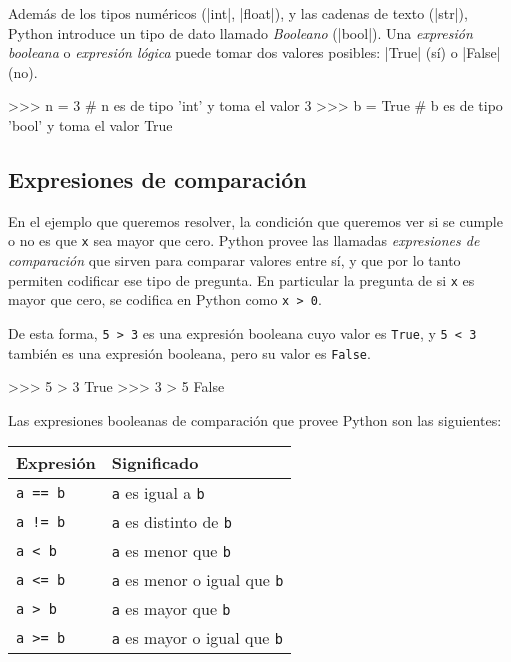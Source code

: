 Además de los tipos numéricos (|int|, |float|), y las cadenas de texto (|str|),
Python introduce un tipo de dato llamado {\it Booleano} (|bool|). Una {\it
expresión booleana} o {\it expresión lógica} puede tomar dos valores posibles:
|True| (sí) o |False| (no).

\begin{codigo-python-sn}
>>> n = 3    # n es de tipo 'int' y toma el valor 3
>>> b = True # b es de tipo 'bool' y toma el valor True
\end{codigo-python-sn}

\subsection{Expresiones de comparación}

En el ejemplo que queremos resolver, la condición que queremos ver si se
cumple o no es que \lstinline!x! sea mayor que cero. Python provee las
llamadas {\it expresiones de comparación} que sirven para comparar valores
entre sí, y que por lo tanto permiten codificar ese tipo de pregunta.  En
particular la pregunta de si \lstinline!x! es mayor que cero, se codifica
en Python como \lstinline!x > 0!.

De esta forma, \lstinline+5 > 3+ es una expresión booleana cuyo valor es
\lstinline!True!, y \lstinline+5 < 3+ también es una expresión booleana, pero su
valor es \lstinline!False!.

\begin{codigo-python-sn}
>>> 5 > 3
True
>>> 3 > 5
False
\end{codigo-python-sn}

Las expresiones
booleanas de comparación que provee Python son las siguientes:

\newcommand{\tablaComparacion}{
\begin{center}
\begin{tabular}[c]{l l}
{\bf Expresión} & {\bf Significado}\\
\hline
\lstinline!a == b!& \lstinline!a! es igual a \lstinline!b! \\
\lstinline+a != b+& \lstinline!a! es distinto de \lstinline!b! \\
\lstinline!a < b!& \lstinline!a! es menor que \lstinline!b! \\
\lstinline!a <= b!& \lstinline!a! es menor o igual que \lstinline!b! \\
\lstinline!a > b!& \lstinline!a! es mayor que \lstinline!b! \\
\lstinline!a >= b!& \lstinline!a! es mayor o igual que \lstinline!b! \\
\end{tabular}
\end{center}
}
\tablaComparacion

